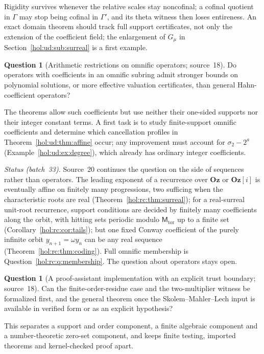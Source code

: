 \documentclass[11pt]{article}
\numberwithin{equation}{section}
\theoremstyle{definition}
\newtheorem{question}[theorem]{Question}
\theoremstyle{remark}
\newcommand{\Oz}{\mathbf{Oz}}
\begin{document}
Rigidity survives whenever the relative scales stay noncofinal; a cofinal
quotient in $\Gamma$ may stop being cofinal in $\Gamma'$, and its theta witness
then loses entireness. An exact domain theorem should track full support
certificates, not only the extension of the coefficient field; the
enlargement of $G_\mu$ in Section~\ref{hol:ud:sub:surreal} is a first example.

\begin{question}[Arithmetic restrictions on omnific operators; source~18]
\label{hol:ud:q:omnific}
Do operators with coefficients in an omnific subring admit stronger bounds on
polynomial solutions, or more effective valuation certificates, than general
Hahn-coefficient operators?
\end{question}

The theorems allow such coefficients but use neither their one-sided supports
nor their integer constant terms. A first task is to study finite-support
omnific coefficients and determine which cancellation profiles in
Theorem~\ref{hol:ud:thm:affine} occur; any improvement must account for
$\sigma_2-2^a$ (Example~\ref{hol:ud:ex:degree}), which already has ordinary
integer coefficients.

\emph{Status (batch~33).} Source~20 continues the question on the side of
sequences rather than operators. The leading exponent of a recurrence over
$\Oz$ or $\Oz[i]$ is eventually affine on finitely many progressions, two
sufficing when the characteristic roots are real
(Theorem~\ref{hol:rc:thm:surreal}); for a real-surreal unit-root recurrence,
support conditions are decided by finitely many coefficients along the orbit,
with hitting sets periodic modulo $\mathsf M_{\mathrm{tor}}$ up to a finite set
(Corollary~\ref{hol:rc:cor:tails}); but one fixed Conway coefficient of the
purely infinite orbit $y_{n+1}=\omega y_n$ can be any real sequence
(Theorem~\ref{hol:rc:thm:coding}). Full omnific membership is
Question~\ref{hol:rc:q:membership}. The question about operators stays open.

\begin{question}[A proof-assistant implementation with an explicit trust
boundary; source~18]\label{hol:ud:q:formal}
Can the finite-order-residue case and the two-multiplier witness be
formalized first, and the general theorem once the Skolem--Mahler--Lech input
is available in verified form or as an explicit hypothesis?
\end{question}

This separates a support and order component, a finite algebraic component
and a number-theoretic zero-set component, and keeps finite testing, imported
theorems and kernel-checked proof apart.
\end{document}
